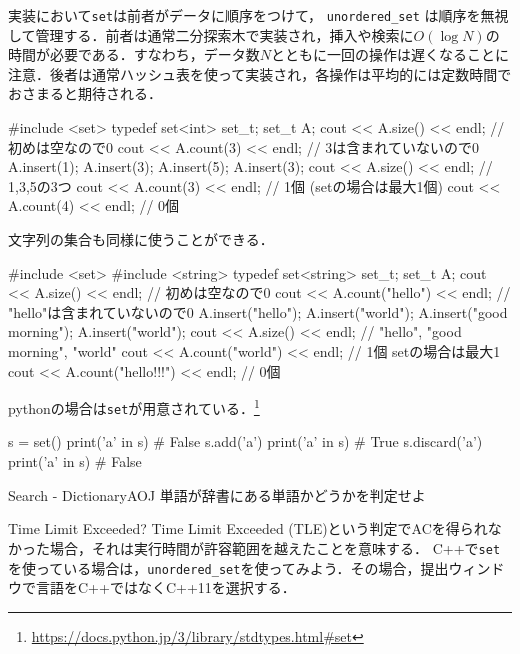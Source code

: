 実装において\texttt{set}は前者がデータに順序をつけて，
\texttt{unordered\_set}
は順序を無視して管理する．前者は通常二分探索木で実装され，挿入や検索に$O(\log N)$の時間が必要である．すなわち，データ数$N$とともに一回の操作は遅くなることに注意．後者は通常ハッシュ表を使って実装され，各操作は平均的には定数時間でおさまると期待される．


\begin{cbox}[emph={set}]
#include <set>
    typedef set<int> set_t;
    set_t A;
    cout << A.size() << endl; // 初めは空なので0
    cout << A.count(3) << endl; // 3は含まれていないので0
    A.insert(1);
    A.insert(3);
    A.insert(5);
    A.insert(3);
    cout << A.size() << endl; // 1,3,5の3つ
    cout << A.count(3) << endl; // 1個 (setの場合は最大1個)
    cout << A.count(4) << endl; // 0個
\end{cbox}

文字列の集合も同様に使うことができる．

\begin{cbox}[emph={set,string}]
#include <set>
#include <string>
    typedef set<string> set_t;
    set_t A;
    cout << A.size() << endl; // 初めは空なので0
    cout << A.count("hello") << endl; // "hello"は含まれていないので0
    A.insert("hello");
    A.insert("world");
    A.insert("good morning");
    A.insert("world");
    cout << A.size() << endl; // "hello", "good morning", "world"
    cout << A.count("world") << endl; // 1個 setの場合は最大1
    cout << A.count("hello!!!") << endl; // 0個
\end{cbox}

pythonの場合は\texttt{set}が用意されている．\footnote{\url{https://docs.python.jp/3/library/stdtypes.html\#set}}
\begin{pybox}
s = set()
print('a' in s)                 # False
s.add('a')
print('a' in s)                 # True
s.discard('a')
print('a' in s)                 # False
\end{pybox}


\begin{psbox}{Search - Dictionary}{AOJ}
単語が辞書にある単語かどうかを判定せよ

\end{psbox}

\begin{tipsbox}{Time Limit Exceeded?}
Time Limit Exceeded (TLE)という判定でACを得られなかった場合，それは実行時間が許容範囲を越えたことを意味する．
C++で\texttt{set}を使っている場合は，\texttt{unordered\_set}を使ってみよう．その場合，提出ウィンドウで言語をC++ではなくC++11を選択する．
\end{tipsbox}

